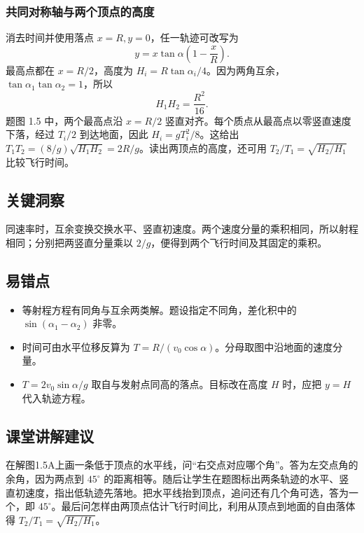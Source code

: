\documentclass[UTF8,fontset=fandol,a4paper,11pt]{ctexart}
\begin{document}
\subsubsection*{共同对称轴与两个顶点的高度}
消去时间并使用落点 $x=R,y=0$，任一轨迹可改写为
\[
y=x\tan\alpha\left(1-\frac{x}{R}\right).
\]
最高点都在 $x=R/2$，高度为 $H_i=R\tan\alpha_i/4$。因为两角互余，$\tan\alpha_1\tan\alpha_2=1$，所以
\[
H_1H_2=\frac{R^2}{16}.
\]
题图 1.5 中，两个最高点沿 $x=R/2$ 竖直对齐。每个质点从最高点以零竖直速度下落，经过 $T_i/2$ 到达地面，因此 $H_i=gT_i^2/8$。这给出 $T_1T_2=(8/g)\sqrt{H_1H_2}=2R/g$。读出两顶点的高度，还可用 $T_2/T_1=\sqrt{H_2/H_1}$ 比较飞行时间。



\subsection*{关键洞察}

同速率时，互余变换交换水平、竖直初速度。两个速度分量的乘积相同，所以射程相同；分别把两竖直分量乘以 $2/g$，便得到两个飞行时间及其固定的乘积。



\subsection*{易错点}

\begin{itemize}
\item 等射程方程有同角与互余两类解。题设指定不同角，差化积中的 $\sin(\alpha_1-\alpha_2)$ 非零。
\item 时间可由水平位移反算为 $T=R/(v_0\cos\alpha)$。分母取图中沿地面的速度分量。
\item $T=2v_0\sin\alpha/g$ 取自与发射点同高的落点。目标改在高度 $H$ 时，应把 $y=H$ 代入轨迹方程。
\end{itemize}



\subsection*{课堂讲解建议}

在解图1.5A上画一条低于顶点的水平线，问“右交点对应哪个角”。答为左交点角的余角，因为两点到 $45^\circ$ 的距离相等。随后让学生在题图标出两条轨迹的水平、竖直初速度，指出低轨迹先落地。把水平线抬到顶点，追问还有几个角可选，答为一个，即 $45^\circ$。最后问怎样由两顶点估计飞行时间比，利用从顶点到地面的自由落体得 $T_2/T_1=\sqrt{H_2/H_1}$。
\end{document}
